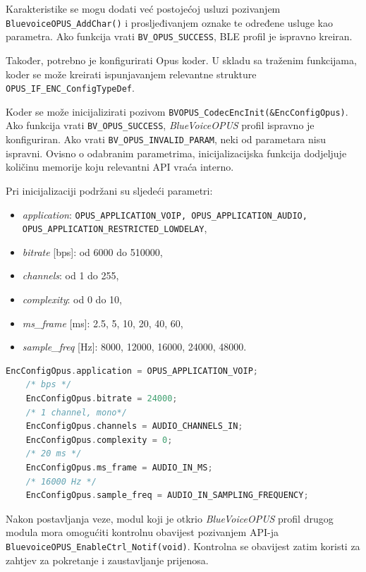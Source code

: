 Karakteristike se mogu dodati već postojećoj usluzi pozivanjem \lstinline|BluevoiceOPUS_AddChar()| i prosljeđivanjem oznake te određene usluge kao parametra. Ako funkcija vrati \lstinline|BV_OPUS_SUCCESS|, BLE profil je ispravno kreiran.

Također, potrebno je konfigurirati Opus koder. U skladu sa traženim funkcijama, koder se može kreirati ispunjavanjem relevantne strukture \lstinline|OPUS_IF_ENC_ConfigTypeDef|.

Koder se može inicijalizirati pozivom \lstinline|BVOPUS_CodecEncInit(&EncConfigOpus)|. Ako funkcija vrati \lstinline|BV_OPUS_SUCCESS|, \textit{BlueVoiceOPUS} profil ispravno je konfiguriran. Ako vrati \lstinline|BV_OPUS_INVALID_PARAM|, neki od parametara nisu ispravni. Ovisno o odabranim parametrima, inicijalizacijska funkcija dodjeljuje količinu memorije koju relevantni API vraća interno. 

Pri inicijalizaciji podržani su sljedeći parametri:
\begin{itemize}
	\item \textit{application}: \lstinline|OPUS_APPLICATION_VOIP, OPUS_APPLICATION_AUDIO, OPUS_APPLICATION_RESTRICTED_LOWDELAY|,
	\item \textit{bitrate} [bps]: od 6000 do 510000,
	\item \textit{channels}: od 1 do 255,
	\item \textit{complexity}: od 0 do 10,
	\item \textit{ms\_frame} [ms]: 2.5, 5, 10, 20, 40, 60,
	\item \textit{sample\_freq} [Hz]: 8000, 12000, 16000, 24000, 48000.
\end{itemize}

\begin{lstlisting}[caption={Parametri za Opus koder}, language=c]
	EncConfigOpus.application = OPUS_APPLICATION_VOIP;
	/* bps */
	EncConfigOpus.bitrate = 24000; 
	/* 1 channel, mono*/
	EncConfigOpus.channels = AUDIO_CHANNELS_IN; 
	EncConfigOpus.complexity = 0;
	/* 20 ms */
	EncConfigOpus.ms_frame = AUDIO_IN_MS; 
	/* 16000 Hz */
	EncConfigOpus.sample_freq = AUDIO_IN_SAMPLING_FREQUENCY; 
\end{lstlisting}

Nakon postavljanja veze, modul koji je otkrio \textit{BlueVoiceOPUS} profil drugog modula mora omogućiti kontrolnu obavijest pozivanjem API-ja \lstinline|BluevoiceOPUS_EnableCtrl_Notif(void)|. Kontrolna se obavijest zatim koristi za zahtjev za pokretanje i zaustavljanje prijenosa.

